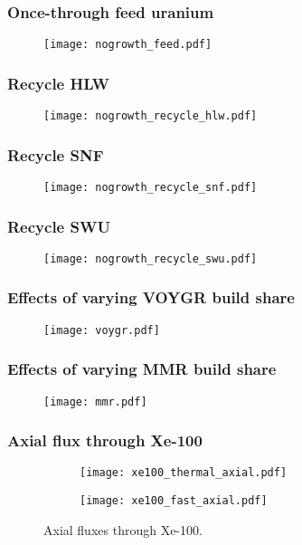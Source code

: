 \begin{frame}
    \frametitle{Once-through feed uranium}
    \begin{figure}
        \centering 
        \texttt{[image: nogrowth\_feed.pdf]}
    \end{figure}
\end{frame}

\begin{frame}
    \frametitle{Recycle HLW}
    \begin{figure}
        \centering
        \texttt{[image: nogrowth\_recycle\_hlw.pdf]}
    \end{figure}
\end{frame}

\begin{frame}
    \frametitle{Recycle SNF}
    \begin{figure}
        \centering
        \texttt{[image: nogrowth\_recycle\_snf.pdf]}
    \end{figure}
\end{frame}

\begin{frame}
    \frametitle{Recycle SWU}
    \begin{figure}
        \centering
        \texttt{[image: nogrowth\_recycle\_swu.pdf]}
    \end{figure}
\end{frame}

\begin{frame}
    \frametitle{Effects of varying VOYGR build share}
    \begin{figure}
        \centering
        \texttt{[image: voygr.pdf]}
    \end{figure}
\end{frame}

\begin{frame}
    \frametitle{Effects of varying MMR build share}
    \begin{figure}
        \centering
        \texttt{[image: mmr.pdf]}
    \end{figure}
\end{frame}

\begin{frame}
    \frametitle{Axial flux through Xe-100}
    \begin{figure}
        \centering 
        \begin{subfigure}{0.49\textwidth}
            \texttt{[image: xe100\_thermal\_axial.pdf]}
        \end{subfigure}
        \begin{subfigure}{0.49\textwidth}
            \texttt{[image: xe100\_fast\_axial.pdf]}
        \end{subfigure}
        \caption{Axial fluxes through Xe-100.}
        \label{fig:xe100-axial-flux}
    \end{figure}
\end{frame}

